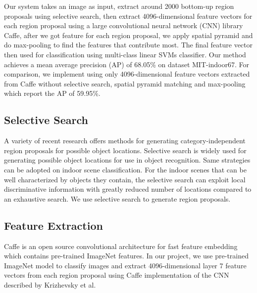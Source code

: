 
Our system takes an image as input, extract around 2000 bottom-up region
proposals using selective search\cite{Uijlings:2013:SSO}, then extract
4096-dimensional feature vectors for each region proposal using a large
convolutional neural network (CNN) library Caffe\cite{},
after we got feature for each region proposal, we apply spatial pyramid and
do max-pooling to find the features that contribute most. The final feature vector
then used for classification using multi-class linear SVMs classifier. Our
method achieves a mean average precision (AP) of 68.05\% on dataset
MIT-indoor67\cite{Quattoni:2009:RIS}. For comparison, we implement using
only 4096-dimensional feature vectors extracted from Caffe without selective
search, spatial pyramid matching and max-pooling which report the AP of
59.95\%.

\subsection{Selective Search}
A variety of recent research offers methods for generating category-independent
region proposals for possible object locations.
Selective search is widely used for generating possible object locations for
use in object recognition\cite{Uijlings:2013:SSO}. Same strategies can be
adopted on indoor scene classification. For the indoor scenes that can be well
characterized by objects they contain, the selective search can exploit local
discriminative information with greatly reduced number of locations compared
to an exhaustive search. We use selective search to generate region proposals.

\subsection{Feature Extraction}
Caffe\cite{} is an open source convolutional architecture for
fast feature embedding which contains pre-trained ImageNet features.
In our project, we use pre-trained ImageNet model to classify images
and extract 4096-dimensional layer 7 feature vectors from each region
proposal using Caffe\cite{} implementation of the CNN described by
Krizhevsky et al\cite{Krizhevsky:2012:ICD}.

